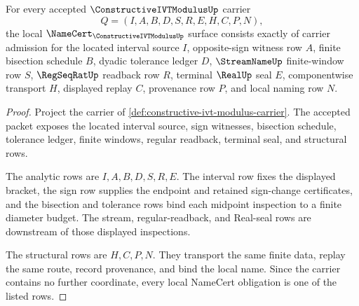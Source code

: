 \begin{theorem}
\label{thm:constructive-ivt-modulus-namecert-obligations}
For every accepted $\ConstructiveIVTModulusUp$ carrier
$$
Q=(I,A,B,D,S,R,E,H,C,P,N),
$$
the local $\NameCert_{\ConstructiveIVTModulusUp}$ surface consists exactly of carrier admission for the located interval source $I$, opposite-sign witness row $A$, finite bisection schedule $B$, dyadic tolerance ledger $D$, $\StreamNameUp$ finite-window row $S$, $\RegSeqRatUp$ readback row $R$, terminal $\RealUp$ seal $E$, componentwise transport $H$, displayed replay $C$, provenance row $P$, and local naming row $N$.
\end{theorem}
\begin{proof}
Project the carrier of \autoref{def:constructive-ivt-modulus-carrier}. The accepted packet exposes the located interval source, sign witnesses, bisection schedule, tolerance ledger, finite windows, regular readback, terminal seal, and structural rows.

The analytic rows are $I,A,B,D,S,R,E$. The interval row fixes the displayed bracket, the sign row supplies the endpoint and retained sign-change certificates, and the bisection and tolerance rows bind each midpoint inspection to a finite diameter budget. The stream, regular-readback, and Real-seal rows are downstream of those displayed inspections.

The structural rows are $H,C,P,N$. They transport the same finite data, replay the same route, record provenance, and bind the local name. Since the carrier contains no further coordinate, every local NameCert obligation is one of the listed rows.
\end{proof}

